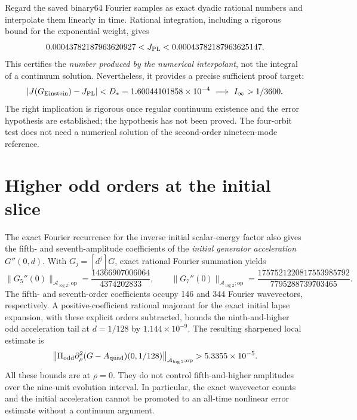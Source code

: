\documentclass[11pt,a4paper]{article}
\theoremstyle{remark}
\newcommand{\A}{\mathcal A_{\log 2}}
\newcommand{\op}{\mathrm{op}}
\begin{document}
Regard the saved binary64 Fourier samples as exact dyadic rational numbers and interpolate them linearly in time. Rational integration, including a rigorous bound for the exponential weight, gives
\begin{equation}\label{eq:dual-value}
0.00043782187963620927<J_{\rm PL}
<0.00043782187963625147.
\end{equation}
This certifies the \emph{number produced by the numerical interpolant}, not the integral of a continuum solution. Nevertheless, it provides a precise sufficient proof target:
\begin{equation}\label{eq:margin}
|J(G_{\rm Einstein})-J_{\rm PL}|
< D_*=1.60044101858\times10^{-4}
\ \Longrightarrow\ I_\infty>1/3600.
\end{equation}
The right implication is rigorous once regular continuum existence and the error hypothesis are established; the hypothesis has not been proved. The four-orbit test does not need a numerical solution of the second-order nineteen-mode reference.

\section{Higher odd orders at the initial slice}
The exact Fourier recurrence for the inverse initial scalar-energy factor also gives the fifth- and seventh-amplitude coefficients of the \emph{initial generator acceleration} $G''(0,d)$. With $G_j=[d^j]G$, exact rational Fourier summation yields
\begin{equation}\label{eq:57}
\|G_5''(0)\|_{\A;\op}
=\frac{14366907006064}{4374202833},\qquad
\|G_7''(0)\|_{\A;\op}
=\frac{1757521220817553985792}{7795288739703465}.
\end{equation}
The fifth- and seventh-order coefficients occupy 146 and 344 Fourier wavevectors, respectively. A positive-coefficient rational majorant for the exact initial lapse expansion, with these explicit orders subtracted, bounds the ninth-and-higher odd acceleration tail at $d=1/128$ by $1.144\times10^{-9}$. The resulting sharpened local estimate is
\begin{equation}\label{eq:localnew}
\left\|\Pi_{\rm odd}
\partial_\rho^2(G-A_{\rm quad})(0,1/128)
\right\|_{\A;\op}>5.3355\times10^{-5}.
\end{equation}
All these bounds are at $\rho=0$. They do not control fifth-and-higher amplitudes over the nine-unit evolution interval. In particular, the exact wavevector counts and the initial acceleration cannot be promoted to an all-time nonlinear error estimate without a continuum argument.
\end{document}
